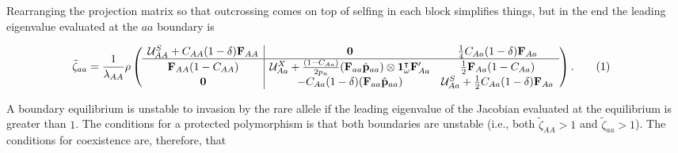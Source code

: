 \documentclass[11pt]{article}
\newcommand\numberthis{\addtocounter{equation}{1}\tag{\theequation}}
\def\mbf#1{\mathbf{#1}}
\def\mcal#1{\mathcal{#1}}
\begin{document}
\noindent Rearranging the projection matrix so that outcrossing comes on top of selfing in each block simplifies things, but in the end the leading eigenvalue evaluated at the $aa$ boundary is 

\begin{align*} \label{eq:eigaa}
	\tilde{\zeta}_{aa} = 
		\frac{1}{\lambda_{AA}} \rho&\left(\begin{array}{c|cc}
				\mcal{U}^S_{AA} + C_{AA} (1 - \delta) \mbf{F}_{AA} & \mbf{0} & \frac{1}{4} C_{Aa} (1 - \delta) \mbf{F}_{Aa}\\ \hline
				\mbf{F}_{AA} (1 - C_{AA}) & \mcal{U}^X_{Aa} + \frac{(1 - C_{Aa})}{2 p_n} (\mbf{F}_{aa} \hat{\mbf{p}}_{aa}) \otimes \mbf{1}^{\intercal}_{\omega} \mbf{F}^{\prime}_{Aa} & \frac{1}{2} \mbf{F}_{Aa} (1 - C_{Aa}) \\ 
				\mbf{0} & -C_{Aa}(1 - \delta) (\mbf{F}_{aa} \hat{\mbf{p}}_{aa}) & \mcal{U}^S_{Aa} + \frac{1}{2} C_{Aa} (1 - \delta) \mbf{F}_{Aa} \\
			\end{array} \right). \numberthis
\end{align*}

A boundary equilibrium is unstable to invasion by the rare allele if the leading eigenvalue of the Jacobian evaluated at the equilibrium is greater than $1$. The conditions for a protected polymorphism is that both boundaries are unstable (i.e., both $\tilde{\zeta}_{AA} > 1$ and $\tilde{\zeta}_{aa} > 1$). The conditions for coexistence are, therefore, that
\end{document}
